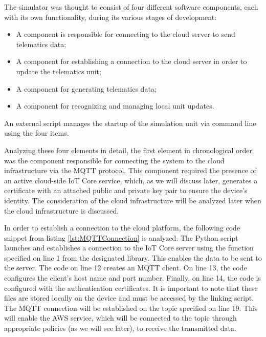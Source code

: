 The simulator was thought to consist of four different software components, each with its own functionality, during its various stages of development:
\begin{itemize}
    \item A component is responsible for connecting to the cloud server to send telematics data;
    \item A component for establishing a connection to the cloud server in order to update the telematics unit;
    \item A component for generating telematics data;
    \item A component for recognizing and managing local unit updates.
\end{itemize}
An external script manages the startup of the simulation unit via command line using the four items. 

Analyzing these four elements in detail, the first element in chronological order was the component responsible for connecting the system to the cloud infrastructure via the MQTT protocol. This component required the presence of an active cloud-side IoT Core service, which, as we will discuss later, generates a certificate with an attached public and private key pair to ensure the device's identity. The consideration of the cloud infrastructure will be analyzed later when the cloud infrastructure is discussed.

In order to establish a connection to the cloud platform, the following code snippet from listing \ref{lst:MQTTConnection} is analyzed. The Python script launches and establishes a connection to the IoT Core server using the function specified on line 1 from the designated library. This enables the data to be sent to the server. The code on line 12 creates an MQTT client. On line 13, the code configures the client's host name and port number. Finally, on line 14, the code is configured with the authentication certificates. It is important to note that these files are stored locally on the device and must be accessed by the linking script. The MQTT connection will be established on the topic specified on line 19. This will enable the AWS service, which will be connected to the topic through appropriate policies (as we will see later), to receive the transmitted data.

